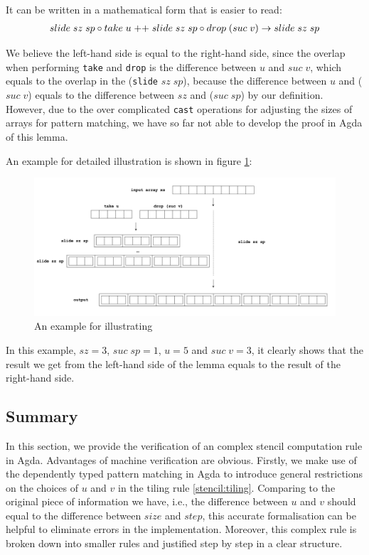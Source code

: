 \documentclass{l4proj}
\begin{document}
It can be written in a mathematical form that is easier to read:
\begin{align}
    slide\; sz\; sp \circ take\; u\; \AgdaFunction{++} \;slide\; sz\; sp \circ drop\; (suc\; v) \to slide\; sz\; sp
\end{align}

We believe the left-hand side is equal to the right-hand side, since the overlap when performing \texttt{take} and \texttt{drop} is the difference between $u$ and $suc\; v$, which equals to the overlap in the (\texttt{slide} $sz\; sp$), because the difference between $u$ and ($suc\; v$) equals to the difference between $sz$ and ($suc\; sp$) by our definition. However, due to the over complicated \texttt{cast} operations for adjusting the sizes of arrays for pattern matching, we have so far not able to develop the proof in Agda of this lemma.

An example for detailed illustration is shown in figure \ref{fig:lem4eg}:
\begin{figure}[!htbp]
    \centering
    \includegraphics[width=1.0\textwidth]{./images/slideExample.png}
    \caption{An example for illustrating }
    \label{fig:lem4eg}
\end{figure}

In this example, $sz = 3$, $suc\; sp = 1$, $u = 5$ and $suc\; v = 3$, it clearly shows that the result we get from the left-hand side of the lemma  equals to the result of the right-hand side.

\subsection{Summary}
\label{stencil:summary}
In this section, we provide the verification of an complex stencil computation rule in Agda. Advantages of machine verification are obvious. Firstly, we make use of the dependently typed pattern matching in Agda to introduce general restrictions on the choices of $u$ and $v$ in the tiling rule \ref{stencil:tiling}. Comparing to the original piece of information we have, i.e., the difference between $u$ and $v$ should equal to the difference between $size$ and $step$, this accurate formalisation can be helpful to eliminate errors in the implementation. Moreover, this complex rule is broken down into smaller rules and justified step by step in a clear structure.
\end{document}
